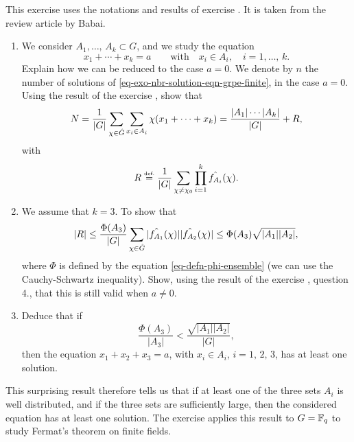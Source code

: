 \begin{exo}
\label{exo-eqn-grpe-abelien-finite}

 This exercise uses the notations and results of exercise . It is taken from the review article by Babai{\upshape \cite{babai-fourier-equations}}. \begin{enumerate}
\item We consider $ A_1, \ldots, \, A_k \subset G$, and we study the equation
\begin{equation}
\label{eq-exo-nbr-solution-eqn-grpe-finite}
x_1 + \cdots + x_k = a \quad \quad \text{with} \quad x_i \in A_i, \quad i = 1, \ldots, \, k.
\end{equation}
Explain how we can be reduced to the case $ a = 0 $. We denote by $n$ the number of solutions of \eqref{eq-exo-nbr-solution-eqn-grpe-finite}, in the case $ a = 0 $. Using the result of the exercise , show that
\begin{equation*}
N = \frac{1}{|G|} \sum_{\chi \in \hat{G}}{\sum_{x_i \in A_i}{\chi(x_1 + \cdots + x_k)}} = \frac{| A_1 |\cdots | A_k |}{|G|} + R,
\end{equation*}
with
\begin{equation*}
R \stackrel{\mbox{\upshape\tiny def.}}{=} \frac{1}{|G|} \sum_{\chi \neq \chi_0}{\prod_{i = 1}^k{\hat{f_{A_i}}(\chi)}}.
\end{equation*}

\item {} We assume that $ k = 3 $. To show that
\begin{equation*}
| R |\leq \frac{\Phi(A_3)}{|G|} \sum_{\chi \in \hat{G}}{|\hat{f_{A_1}}(\chi) | |\hat{f_{A_2}}(\chi) |} \leq \Phi(A_3) \sqrt{| A_1 | | A_2 |},
\end{equation*}
where $\Phi $ is defined by the equation \eqref{eq-defn-phi-ensemble} (we can use the Cauchy-Schwartz inequality). Show, using the result of the exercise , question 4., that this is still valid when $ a \neq 0 $.
\item Deduce that if
\begin{equation*}
\frac{\Phi(A_3)}{| A_3 |} <\frac{\sqrt{| A_1 | | A_2 |}}{|G|},
\end{equation*}
then the equation $ x_1 + x_2 + x_3 = a $, with $ x_i \in A_i $, $ i = 1, \, 2, \, 3 $, has at least one solution.
\end{enumerate} This surprising result therefore tells us that if at least one of the three sets $ A_i $ is well distributed, and if the three sets are sufficiently large, then the considered equation has at least one solution. The exercise  applies this result to $ G = \mathbb{F}_q $ to study Fermat's theorem on finite fields.
\end{exo}


